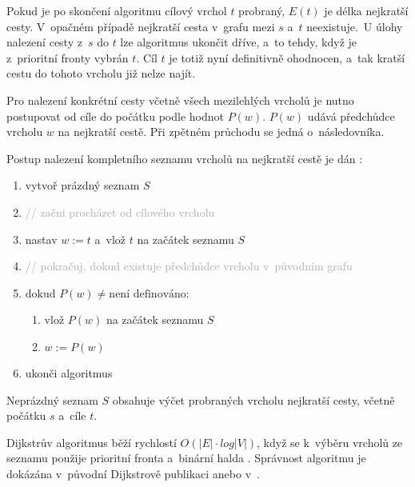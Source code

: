 Pokud je po skončení algoritmu cílový vrchol $t$ probraný, $E(t)$ je délka nejkratší cesty. V~opačném případě nejkratší cesta v~grafu mezi $s$ a~$t$ neexistuje.~U úlohy nalezení cesty z~\(s\) do \(t\) lze algoritmus ukončit dříve, a~to tehdy, když je z~prioritní fronty vybrán \(t\). Cíl \(t\) je totiž nyní definitivně ohodnocen, a~tak kratší cestu do tohoto vrcholu již nelze najít.

Pro nalezení konkrétní cesty včetně všech mezilehlých vrcholů je nutno postupovat od cíle do počátku podle hodnot $P(w)$. $P(w)$ udává předchůdce vrcholu $w$ na nejkratší cestě. Při zpětném průchodu se jedná o~následovníka. 

{\normalsize
\colorbox{gray!10}{%
\begin{minipage}{0.95\textwidth}
\vspace{0.5em}
\begin{minipage}{0.98\textwidth}
	
	Postup nalezení kompletního seznamu vrcholů na nejkratší cestě je dán \cite{mffDijkstraKucera}:
	\begin{enumerate}
		\item vytvoř prázdný seznam $S$
		\item[] \textcolor{darkgray}{\small // začni procházet od cílového vrcholu}
		\item nastav $w := t$ a~vlož $t$ na začátek seznamu $S$
		\item[] \textcolor{darkgray}{\small // pokračuj, dokud existuje předchůdce vrcholu v~původním grafu}
		\item dokud $P(w) \neq \text{není definováno}$:
		\begin{enumerate}[label ={\normalfont\itembox(0.1em)(0.1em){\arabic{enumi}.\arabic*}}]
			\item vlož $P(w)$ na začátek seznamu $S$
			\item $w := P(w)$
		\end{enumerate}
		\item ukonči algoritmus
	\end{enumerate}
	\end{minipage}
	\vspace{0.5em}
\end{minipage}%
}}

Neprázdný seznam $S$ obsahuje výčet probraných vrcholu nejkratší cesty, včetně počátku $s$ a~cíle $t$.

Dijkstrův algoritmus běží rychlostí $O(|E|\cdot log|V|)$, když se k~výběru vrcholů ze seznamu použije prioritní fronta a~binární halda \cite{ericksonShortestPaths}. Správnost algoritmu je dokázána v~původní Dijkstrově publikaci anebo v~\cite{mffDijkstraKucera}.

